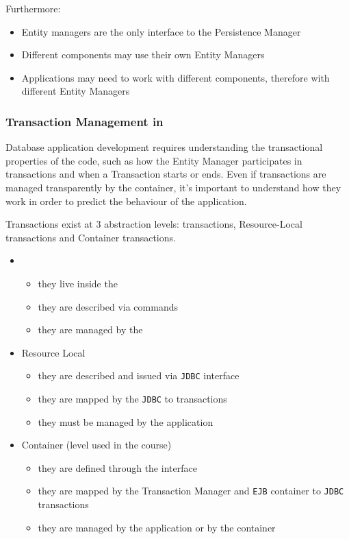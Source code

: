 \documentclass[english]{article}
\begin{document}
\bigskip
Furthermore:

\begin{itemize}
  \item Entity managers are the only interface to the Persistence Manager
  \item Different components may use their own Entity Managers
  \item Applications may need to work with different components, therefore with different Entity Managers
\end{itemize}

\subsubsection{Transaction Management in \jpa}

Database application development requires understanding the transactional properties of the code, such as
how the Entity Manager participates in transactions and when a Transaction starts or ends.
Even if transactions are managed transparently by the container, it's important to understand how they work in order to predict the behaviour of the application.

Transactions exist at \(3\) abstraction levels: \dbms transactions, Resource-Local transactions and Container transactions.

\begin{itemize}
  \item \dbms
        \begin{itemize}
          \item they live inside the \dbms
          \item they are described via \sql commands
          \item they are managed by the \dbms
        \end{itemize}
  \item Resource Local
        \begin{itemize}
          \item they are described and issued via \texttt{JDBC} interface
          \item they are mapped by the \texttt{JDBC} to \dbms transactions
          \item they must be managed by the application
        \end{itemize}
  \item Container (level used in the course)
        \begin{itemize}
          \item they are defined through the \jta interface
          \item they are mapped by the \jta Transaction Manager and \texttt{EJB} container to \texttt{JDBC} transactions
          \item they are managed by the application or by the container
        \end{itemize}
\end{itemize}
\end{document}
